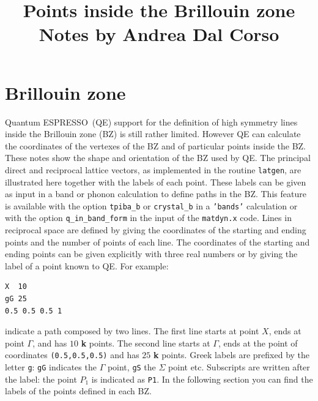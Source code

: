 \documentclass[12pt,a4paper]{article}
\def\qe{{\sc Quantum ESPRESSO}}
\def\qeImage{../../Doc/quantum_espresso.pdf}
\def\democritosImage{../../Doc/democritos.pdf}
\begin{document}
 
\author{}
\date{}
\title{
  \vskip 1cm
  \Huge Points inside the Brillouin zone \\
  \Large Notes by Andrea Dal Corso
}
\maketitle

\newpage

\section{Brillouin zone}

\qe\ (QE) support for the definition of high symmetry lines inside the Brillouin
zone (BZ) is still rather limited. However QE can calculate the coordinates 
of the vertexes of the BZ and of particular points inside the BZ. These 
notes show the shape and orientation of the BZ used by QE. The principal 
direct and reciprocal lattice vectors, as implemented 
in the routine \texttt{latgen}, are illustrated here together with the labels 
of each point. These labels can be given as input in a band or phonon 
calculation to define paths in the BZ. This feature is available with 
the option \texttt{tpiba\_b} or \texttt{crystal\_b} in a \texttt{'bands'} 
calculation or with the option \texttt{q\_in\_band\_form} in the input of the 
\texttt{matdyn.x} code.
Lines in reciprocal space are defined by giving the coordinates of the 
starting and ending points and the number of points of each line.
The coordinates of the starting and ending points can be 
given explicitly with three real numbers or by giving the label of a 
point known to QE.
For example:
\begin{verbatim}
X  10
gG 25
0.5 0.5 0.5 1
\end{verbatim}
indicate a path composed by two lines. The first line starts at point $X$,
ends at point $\Gamma$, and has $10$ {\bf k} points. The second line starts
at $\Gamma$, ends at the point of coordinates \texttt{(0.5,0.5,0.5)} and
has $25$ {\bf k} points. Greek labels are prefixed by the letter
\texttt{g}: \texttt{gG} indicates the $\Gamma$ point, \texttt{gS} the 
$\Sigma$ point etc. Subscripts are written after the label: the point $P_1$ 
is indicated as \texttt{P1}. In the following section you can find the
labels of the points defined in each BZ. 
\end{document}
